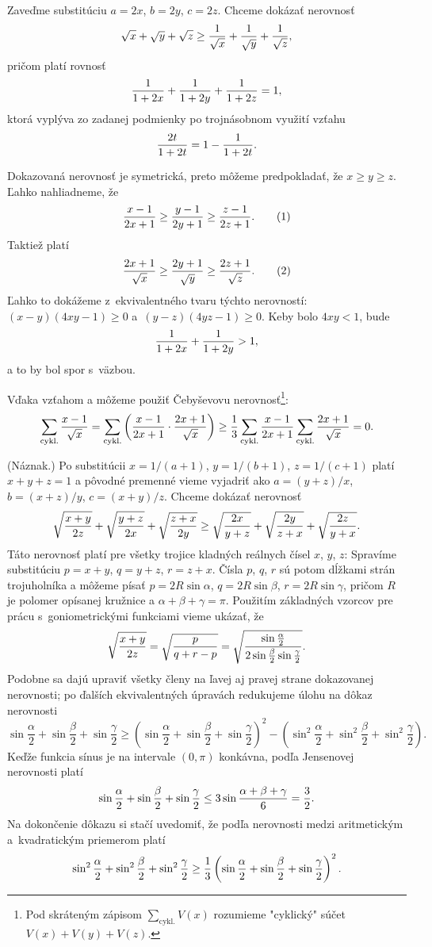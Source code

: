 {%
Zaveďme substitúciu $a = 2x$, $b = 2y$, $c = 2z$. Chceme dokázať nerovnosť
$$
\sqrt{x}+\sqrt{y}+\sqrt{z}\ge {1\over \sqrt x}+{1\over \sqrt y}+{1\over \sqrt z},
$$
pričom platí rovnosť
$$
{1\over 1+2x}+{1\over 1+2y}+{1\over 1+2z} = 1,
$$
ktorá vyplýva zo zadanej podmienky po trojnásobnom využití vzťahu
$$
{2t\over 1+2t} = 1 - {1\over 1+2t}.
$$

Dokazovaná nerovnosť je symetrická, preto môžeme predpokladať, že $x\ge y\ge z$.
Ľahko nahliadneme, že
$$
{x-1\over 2x+1}\ge {y-1\over 2y+1}\ge {z-1\over 2z+1}.
\tag1
$$
Taktiež platí
$$
{2x+1\over \sqrt x}\ge {2y+1\over \sqrt y}\ge {2z+1\over \sqrt z}.
\tag2
$$
Ľahko to dokážeme z~ekvivalentného tvaru týchto nerovností: $(x-y)(4xy-1)\ge 0$ a~$(y-z)(4yz-1)\ge 0$. Keby bolo $4xy < 1$, bude
$$
{1\over 1+2x}+{1\over 1+2y} > 1,
$$
a to by bol spor s~väzbou.

Vďaka vzťahom  a  môžeme použiť Čebyševovu nerovnosť\footnote{Pod skráteným zápisom $\displaystyle\sum_{\text{cykl.}}V(x)$ rozumieme "cyklický" súčet $V(x)+V(y)+V(z).$}:
$$
\sum_{\text{cykl.}} {x-1\over \sqrt x}=\sum_{\text{cykl.}} \left({x-1\over 2x+1}\cdot {2x+1\over \sqrt x}\right)\ge {1\over 3} \sum_{\text{cykl.}} {x-1\over 2x+1} \sum_{\text{cykl.}} {2x+1\over \sqrt x} = 0.
$$

\ineriesenie (Náznak.)
Po substitúcii $x = 1/(a+1)$, $y = 1/(b+1)$, $z = 1/(c+1)$ platí $x+y+z=1$ a pôvodné premenné vieme vyjadriť ako $a = (y+z)/x$, $b = (x+z)/y$, $c = (x+y)/z$.
Chceme dokázať nerovnosť
$$
\sqrt{x+y\over 2z}+\sqrt{y+z\over 2x}+\sqrt{z+x\over 2y}\ge \sqrt{2x\over y+z}+\sqrt{2y\over z+x}+\sqrt{2z\over y+x}.
$$
Táto nerovnosť platí pre všetky trojice kladných reálnych čísel $x$, $y$, $z$: Spravíme substitúciu $p = x+y$, $q = y+z$, $r=z+x$. Čísla $p$, $q$, $r$ sú potom dĺžkami strán trojuholníka a môžeme písať $p=2R\sin\alpha$, $q = 2R\sin\beta$, $r=2R\sin \gamma$, pričom $R$ je polomer opísanej kružnice a $\alpha+\beta+\gamma=\pi$. Použitím základných vzorcov pre prácu s~goniometrickými funkciami vieme ukázať, že
$$
\sqrt{x+y\over 2z}=\sqrt{p\over q+r-p} = \sqrt{\sin\frac\alpha2\over 2\sin\frac\beta2\sin\frac\gamma2}.
$$
Podobne sa dajú upraviť všetky členy na ľavej aj pravej strane dokazovanej nerovnosti; po ďalších ekvivalentných úpravách redukujeme úlohu na dôkaz nerovnosti
$$
\sin\frac\alpha2 + \sin\frac\beta2 + \sin\frac\gamma2 \ge \left(\sin\frac\alpha2 + \sin\frac\beta2+\sin\frac\gamma2\right)^2-\left(\sin^2\frac\alpha2 + \sin^2\frac\beta2+\sin^2\frac\gamma2\right).
$$
Keďže funkcia sínus je na intervale $(0,\pi)$ konkávna, podľa Jensenovej nerovnosti platí
$$
\sin\frac\alpha2 + \sin\frac\beta2 + \sin\frac\gamma2\le 3\sin{\alpha+\beta+\gamma\over 6} = {3\over 2}.
$$
Na dokončenie dôkazu si stačí uvedomiť, že podľa nerovnosti medzi aritmetickým a~kvadratickým priemerom platí
$$
\sin^2\frac\alpha2 + \sin^2\frac\beta2+\sin^2\frac\gamma2\ge {1\over 3}\left(\sin\frac\alpha2 + \sin\frac\beta2+\sin\frac\gamma2\right)^2.
$$
}

